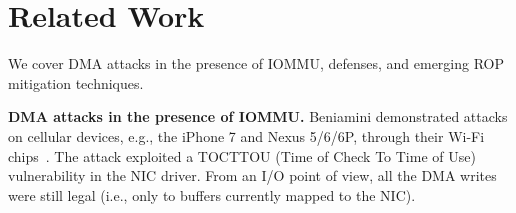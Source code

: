 \section{Related Work}
We cover DMA attacks in the presence of IOMMU, defenses, and emerging ROP mitigation techniques.

\smallskip
\noindent\textbf{DMA attacks in the presence of IOMMU.}
Beniamini demonstrated attacks on cellular devices, e.g., the iPhone 7 and Nexus 5/6/6P, through their Wi-Fi chips~\cite{Ben17a, Ben17b}. 
The attack exploited a TOCTTOU (Time of Check To Time of Use) vulnerability in the NIC driver. From an I/O point of view, all the DMA writes were still legal (i.e., only to buffers currently mapped to the NIC).


